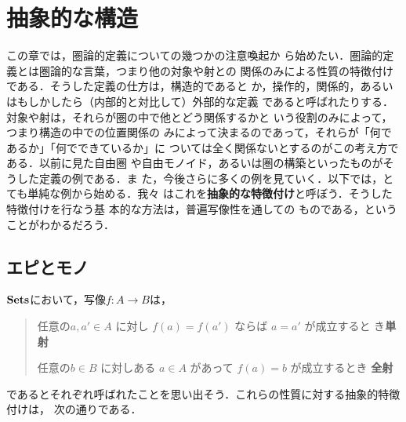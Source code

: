 \chapter{抽象的な構造}\label{Ch:Abstract Structure}
この章では，圏論的定義についての幾つかの注意喚起か
ら始めたい．圏論的定義とは圏論的な言葉，つまり他の対象や射との
関係のみによる性質の特徴付けである．そうした定義の仕方は，構造的であると
か，操作的，関係的，あるいはもしかしたら（内部的と対比して）外部的な定義
であると呼ばれたりする．対象や射は，それらが圏の中で他とどう関係するかと
いう役割のみによって，つまり構造の中での位置関係の
みによって決まるのであって，それらが「何であるか」「何でできているか」に
ついては全く関係ないとするのがこの考え方である．以前に見た自由圏
や自由モノイド，あるいは圏の構築といったものがそうした定義の例である．ま
た，今後さらに多くの例を見ていく．以下では，とても単純な例から始める．我々
はこれを{\bfseries 抽象的な特徴付け}と呼ぼう．そうした特徴付けを行なう基
本的な方法は，普遍写像性を通しての
ものである，ということがわかるだろう．

\section{エピとモノ}
$\mathbf{Sets}$において，写像$f: A\to B$は，
\begin{quotation}
 任意の$a, a' \in A$ に対し $f(a) = f(a')$ ならば $a = a'$ が成立すると
 き{\bfseries 単射}

 任意の$b \in B$ に対しある $a \in A$ があって $f(a) = b$ が成立するとき
 {\bfseries 全射}
\end{quotation}
であるとそれぞれ呼ばれたことを思い出そう．これらの性質に対する抽象的特徴付けは，
次の通りである．

